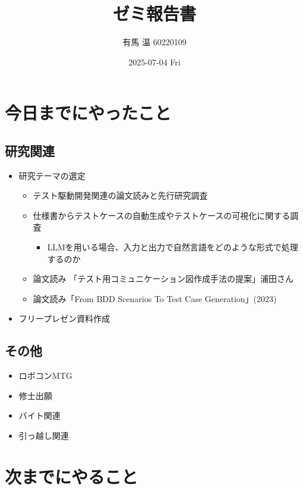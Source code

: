 \documentclass[uplatex, onecolumn, 10pt]{jsarticle}
\begin{document}
\title{\vspace{-40mm}\bf{\LARGE{ゼミ報告書}}}
\author{\vspace{-40mm}有馬 温  60220109}
\date{2025-07-04 Fri}
\maketitle

\section{今日までにやったこと}
\subsection*{研究関連}
\begin{itemize}
    \item 研究テーマの選定
    \begin{itemize}
        \item テスト駆動開発関連の論文読みと先行研究調査
        \item 仕様書からテストケースの自動生成やテストケースの可視化に関する調査
            \begin{itemize}
                \item LLMを用いる場合、入力と出力で自然言語をどのような形式で処理するのか
            \end{itemize}
        \item 論文読み 「テスト用コミュニケーション図作成手法の提案」浦田さん
        \item 論文読み「From BDD Scenarios To Test Case Generation」(2023)
    \end{itemize}
    \item フリープレゼン資料作成
\end{itemize}

\subsection*{その他}
\begin{itemize}
    \item ロボコンMTG
    \item 修士出願
    \item バイト関連
    \item 引っ越し関連
\end{itemize}

\section{次までにやること}
\end{document}
